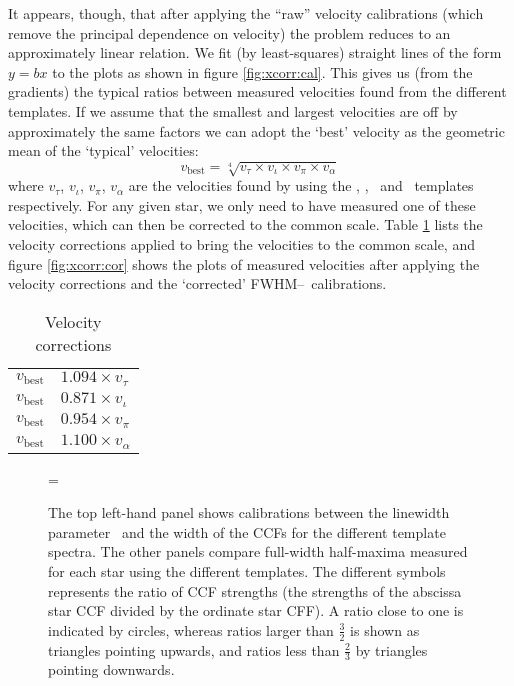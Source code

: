 It appears, though, that after applying the ``raw'' velocity calibrations
(which remove the principal dependence on velocity) the problem reduces to an
approximately linear relation. We fit (by least-squares) straight lines of the
form $y = bx$ to the plots as shown in figure \ref{fig:xcorr:cal}. This gives
us (from the gradients) the typical ratios between
measured velocities found from the different templates. If we assume
that the smallest and largest velocities are off by approximately the
same factors we can adopt the `best' velocity as the geometric mean of the
`typical' velocities:
\begin{equation*}
v_\mathrm{best} = \sqrt[4]{v_\tau \times v_\iota \times v_\pi \times v_\alpha}
\end{equation*}
where $v_\tau$, $v_\iota$, $v_\pi$, $v_\alpha$ are the velocities
found by using the \tausco, \iother, \picet\ and \alplyr\ templates
respectively. For any given star, we only need to have measured one of
these velocities, which can then be corrected to the common
scale. Table \ref{ta:xcorr:funcs} lists the velocity corrections
applied to bring the velocities to the common scale, and figure
\ref{fig:xcorr:cor} shows the plots of measured velocities after
applying the velocity corrections and the `corrected' FWHM--\vsini\
calibrations.

\begin{table} %
\begin{center}
\caption{Velocity corrections}
\label{ta:xcorr:funcs}
\vspace{\abovecaptionskip}
\begin{tabular}{c@{ = }l}
\hline\hline
$v_\mathrm{best}$ & $1.094 \times v_\tau$   \\ 
$v_\mathrm{best}$ & $0.871 \times v_\iota$  \\
$v_\mathrm{best}$ & $0.954 \times v_\pi$    \\
$v_\mathrm{best}$ & $1.100 \times v_\alpha$ \\
\hline\hline
\end{tabular}
\end{center}
\end{table}   %

\begin{figure} %
\epsfxsize=\figwidth
\setlength{\cen}{(\textwidth / 2) - (\epsfxsize / 2)}
\hspace{\cen}
\caption[Measured FWHMs and \vsini\ calibrations]
{\fcfont The top left-hand panel shows calibrations between the
linewidth parameter \vsini\ and the width of the CCFs for the
different template spectra. The other panels compare full-width
half-maxima measured for each star using the different templates. The
different symbols represents the ratio of CCF strengths (the strengths
of the abscissa star CCF divided by the ordinate star CFF). A ratio
close to one is indicated by circles, whereas ratios larger than
$\frac{3}{2}$ is shown as triangles pointing upwards, and ratios less
than $\frac{2}{3}$ by triangles pointing downwards.
}
\label{fig:xcorr:fwhm}
\end{figure}   %
 

